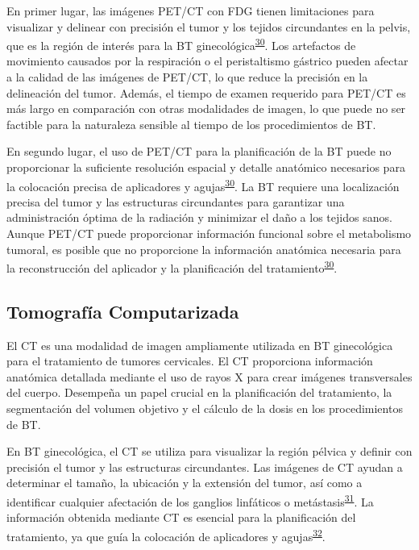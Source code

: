 \documentclass[
  a4paper,
]{scrreprt}
\begin{document}
En primer lugar, las imágenes PET/CT con FDG tienen limitaciones para
visualizar y delinear con precisión el tumor y los tejidos circundantes
en la pelvis, que es la región de interés para la BT
ginecológica\textsuperscript{\protect\hyperlink{ref-liu2019}{30}}. Los
artefactos de movimiento causados por la respiración o el peristaltismo
gástrico pueden afectar a la calidad de las imágenes de PET/CT, lo que
reduce la precisión en la delineación del tumor. Además, el tiempo de
examen requerido para PET/CT es más largo en comparación con otras
modalidades de imagen, lo que puede no ser factible para la naturaleza
sensible al tiempo de los procedimientos de BT.

En segundo lugar, el uso de PET/CT para la planificación de la BT puede
no proporcionar la suficiente resolución espacial y detalle anatómico
necesarios para la colocación precisa de aplicadores y
agujas\textsuperscript{\protect\hyperlink{ref-liu2019}{30}}. La BT
requiere una localización precisa del tumor y las estructuras
circundantes para garantizar una administración óptima de la radiación y
minimizar el daño a los tejidos sanos. Aunque PET/CT puede proporcionar
información funcional sobre el metabolismo tumoral, es posible que no
proporcione la información anatómica necesaria para la reconstrucción
del aplicador y la planificación del
tratamiento\textsuperscript{\protect\hyperlink{ref-liu2019}{30}}.

\hypertarget{sec-imageCT}{%
\subsection{Tomografía Computarizada}\label{sec-imageCT}}

El CT es una modalidad de imagen ampliamente utilizada en BT
ginecológica para el tratamiento de tumores cervicales. El CT
proporciona información anatómica detallada mediante el uso de rayos X
para crear imágenes transversales del cuerpo. Desempeña un papel crucial
en la planificación del tratamiento, la segmentación del volumen
objetivo y el cálculo de la dosis en los procedimientos de BT.

En BT ginecológica, el CT se utiliza para visualizar la región pélvica y
definir con precisión el tumor y las estructuras circundantes. Las
imágenes de CT ayudan a determinar el tamaño, la ubicación y la
extensión del tumor, así como a identificar cualquier afectación de los
ganglios linfáticos o
metástasis\textsuperscript{\protect\hyperlink{ref-uxf6zsarlak2003}{31}}.
La información obtenida mediante CT es esencial para la planificación
del tratamiento, ya que guía la colocación de aplicadores y
agujas\textsuperscript{\protect\hyperlink{ref-huang2018}{32}}.
\end{document}
